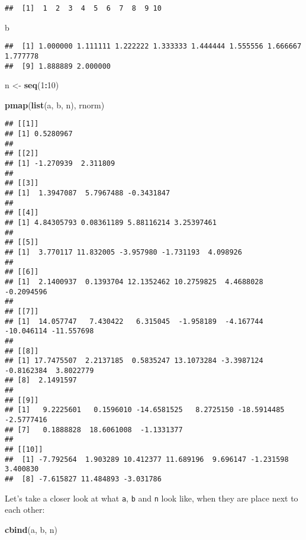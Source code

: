 \documentclass[
]{article}
\newenvironment{Shaded}{\begin{snugshade}}{\end{snugshade}}
\newcommand{\DecValTok}[1]{\textcolor[rgb]{0.00,0.00,0.81}{#1}}
\newcommand{\KeywordTok}[1]{\textcolor[rgb]{0.13,0.29,0.53}{\textbf{#1}}}
\newcommand{\NormalTok}[1]{#1}
\newcommand{\OperatorTok}[1]{\textcolor[rgb]{0.81,0.36,0.00}{\textbf{#1}}}
\newcommand{\StringTok}[1]{\textcolor[rgb]{0.31,0.60,0.02}{#1}}
\begin{document}
\begin{verbatim}
##  [1]  1  2  3  4  5  6  7  8  9 10
\end{verbatim}

\begin{Shaded}
\begin{Highlighting}[]
\NormalTok{b}
\end{Highlighting}
\end{Shaded}

\begin{verbatim}
##  [1] 1.000000 1.111111 1.222222 1.333333 1.444444 1.555556 1.666667 1.777778
##  [9] 1.888889 2.000000
\end{verbatim}

\begin{Shaded}
\begin{Highlighting}[]
\NormalTok{n \textless{}{-}}\StringTok{ }\KeywordTok{seq}\NormalTok{(}\DecValTok{1}\OperatorTok{:}\DecValTok{10}\NormalTok{)}

\KeywordTok{pmap}\NormalTok{(}\KeywordTok{list}\NormalTok{(a, b, n), rnorm)}
\end{Highlighting}
\end{Shaded}

\begin{verbatim}
## [[1]]
## [1] 0.5280967
## 
## [[2]]
## [1] -1.270939  2.311809
## 
## [[3]]
## [1]  1.3947087  5.7967488 -0.3431847
## 
## [[4]]
## [1] 4.84305793 0.08361189 5.88116214 3.25397461
## 
## [[5]]
## [1]  3.770117 11.832005 -3.957980 -1.731193  4.098926
## 
## [[6]]
## [1]  2.1400937  0.1393704 12.1352462 10.2759825  4.4688028 -0.2094596
## 
## [[7]]
## [1]  14.057747   7.430422   6.315045  -1.958189  -4.167744 -10.046114 -11.557698
## 
## [[8]]
## [1] 17.7475507  2.2137185  0.5835247 13.1073284 -3.3987124 -0.8162384  3.8022779
## [8]  2.1491597
## 
## [[9]]
## [1]   9.2225601   0.1596010 -14.6581525   8.2725150 -18.5914485  -2.5777416
## [7]   0.1888828  18.6061008  -1.1331377
## 
## [[10]]
##  [1] -7.792564  1.903289 10.412377 11.689196  9.696147 -1.231598  3.400830
##  [8] -7.615827 11.484893 -3.031786
\end{verbatim}

Let's take a closer look at what \texttt{a}, \texttt{b} and \texttt{n} look like, when they are place next to each other:

\begin{Shaded}
\begin{Highlighting}[]
\KeywordTok{cbind}\NormalTok{(a, b, n)}
\end{Highlighting}
\end{Shaded}
\end{document}
